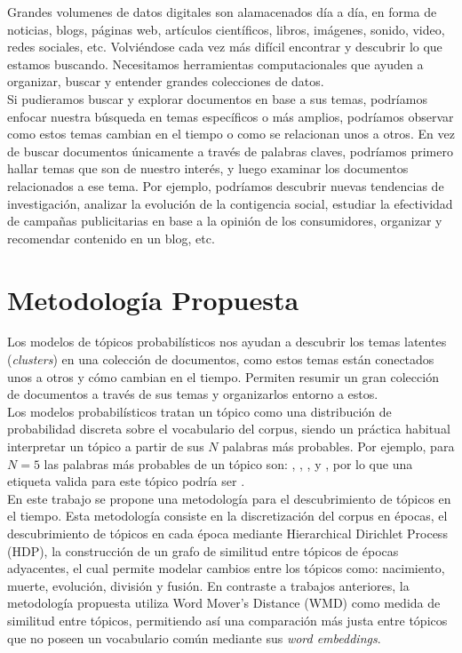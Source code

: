 \documentclass[letterpaper,12pt,oneside]{book} %
\begin{document}
Grandes volumenes de datos digitales son alamacenados día a día, en forma de noticias, blogs, páginas web, artículos científicos, libros, imágenes, sonido, video, redes sociales, etc. Volviéndose cada vez más difícil encontrar y descubrir lo que estamos buscando. Necesitamos herramientas computacionales que ayuden a organizar, buscar y entender grandes colecciones de datos.\\

Si pudieramos buscar y explorar documentos en base a sus temas, podríamos enfocar nuestra búsqueda en temas específicos o más amplios, podríamos observar como estos temas cambian en el tiempo o como se relacionan unos a otros. En vez de buscar documentos únicamente a través de palabras claves, podríamos primero hallar temas que son de nuestro interés, y luego examinar los documentos relacionados a ese tema. Por ejemplo, podríamos descubrir nuevas tendencias de investigación, analizar la evolución de la contigencia social, estudiar la efectividad de campañas publicitarias en base a la opinión de los consumidores, organizar y recomendar contenido en un blog, etc.\\

\section{Metodología Propuesta}
Los modelos de tópicos probabilísticos nos ayudan a descubrir los temas latentes (\textit{clusters}) en una colección de documentos, como estos temas están conectados unos a otros y cómo cambian en el tiempo. Permiten resumir un gran colección de documentos a través de sus temas y organizarlos entorno a estos.\\

Los modelos probabilísticos tratan un tópico como una distribución de probabilidad discreta sobre el vocabulario del corpus, siendo un práctica habitual interpretar un tópico a partir de sus $N$ palabras más probables. Por ejemplo, para $N=5$ las palabras más probables de un tópico son: , , ,  y , por lo que una etiqueta valida para este tópico podría ser .\\ 

En este trabajo se propone una metodología para el descubrimiento de tópicos en el tiempo. Esta metodología consiste en la discretización del corpus en épocas, el descubrimiento de tópicos en cada época mediante Hierarchical Dirichlet Process (HDP), la construcción de un grafo de similitud entre tópicos de épocas adyacentes, el cual permite modelar cambios entre los tópicos como: nacimiento, muerte, evolución, división y fusión. En contraste a trabajos anteriores, la metodología propuesta utiliza Word Mover's Distance (WMD) como medida de similitud entre tópicos, permitiendo así una comparación más justa entre tópicos que no poseen un vocabulario común mediante sus \textit{word embeddings}.\\
\end{document}
